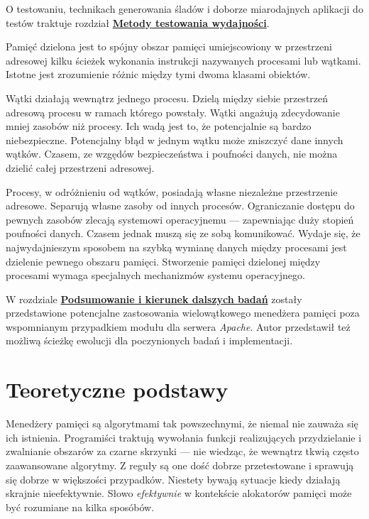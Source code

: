 \documentclass[12pt,a4paper,titlepage,twoside]{mwart}
\begin{document}
O testowaniu, technikach generowania śladów i doborze miarodajnych aplikacji do
testów traktuje rozdział \hyperlink{Testowanie}{\textbf{Metody testowania
wydajności}}.

Pamięć dzielona jest to spójny obszar pamięci umiejscowiony w przestrzeni
adresowej kilku ścieżek wykonania instrukcji nazywanych procesami lub wątkami.
Istotne jest zrozumienie różnic między tymi dwoma klasami obiektów.

Wątki działają wewnątrz jednego procesu. Dzielą między siebie przestrzeń
adresową procesu w ramach którego powstały. Wątki angażują zdecydowanie mniej
zasobów niż procesy. Ich wadą jest to, że potencjalnie są bardzo niebezpieczne.
Potencjalny błąd w jednym wątku może zniszczyć dane innych wątków. Czasem, ze
wzgędów bezpieczeństwa i poufności danych, nie można dzielić całej przestrzeni
adresowej.

Procesy, w odróżnieniu od wątków, posiadają własne niezależne przestrzenie
adresowe. Separują własne zasoby od innych procesów. Ograniczanie dostępu do
pewnych zasobów zlecają systemowi operacyjnemu --- zapewniając duży stopień
poufności danych. Czasem jednak muszą się ze sobą komunikować. Wydaje się, że
najwydajnieszym sposobem na szybką wymianę danych między procesami jest
dzielenie pewnego obszaru pamięci. Stworzenie pamięci dzielonej między
procesami wymaga specjalnych mechanizmów systemu operacyjnego.


W rozdziale \hyperlink{Podsumowanie}{\textbf{Podsumowanie i kierunek dalszych
badań}} zostały przedstawione potencjalne zastosowania wielowątkowego menedżera
pamięci poza wspomnianym przypadkiem modułu dla serwera \textit{Apache}. Autor
przedstawił też możliwą ścieżkę ewolucji dla poczynionych badań i
implementacji.

\newpage


\section{Teoretyczne podstawy}
\hypertarget{Teoria}{}

Menedżery pamięci są algorytmami tak powszechnymi, że niemal nie zauważa się ich
istnienia. Programiści traktują wywołania funkcji realizujących przydzielanie i
zwalnianie obszarów za czarne skrzynki --- nie wiedząc, że wewnątrz tkwią często
zaawansowane algorytmy. Z reguły są one dość dobrze przetestowane i sprawują
się dobrze w większości przypadków. Niestety bywają sytuacje kiedy działają
skrajnie nieefektywnie.  Słowo \textit{efektywnie} w kontekście alokatorów
pamięci może być rozumiane na kilka sposóbów.
\end{document}
